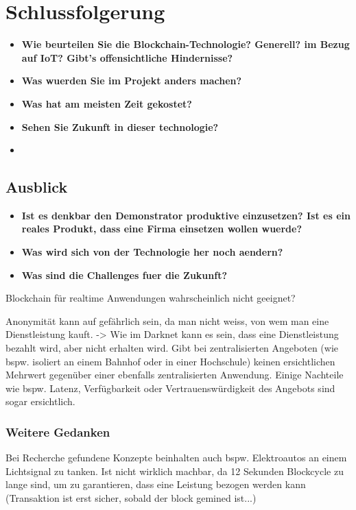 \chapter{Schlussfolgerung}
\label{cha:Schlussfolgerung}
\begin{itemize}
    \item \textbf{Wie beurteilen Sie die Blockchain-Technologie? Generell? im Bezug auf IoT? Gibt's offensichtliche Hindernisse?}
    \item \textbf{Was wuerden Sie im Projekt anders machen?}
    \item \textbf{Was hat am meisten Zeit gekostet?}
    
    \item \textbf{Sehen Sie Zukunft in dieser technologie?}
    \item \textbf{}
\end{itemize}

\section{Ausblick}
\label{sec:Ausblick}
\begin{itemize}
    \item \textbf{Ist es denkbar den Demonstrator produktive einzusetzen? Ist es ein reales Produkt, dass eine Firma einsetzen wollen wuerde?}
    \item \textbf{Was wird sich von der Technologie her noch aendern?}
    \item \textbf{Was sind die Challenges fuer die Zukunft?}
\end{itemize}
Blockchain für realtime Anwendungen wahrscheinlich nicht geeignet?
\par
Anonymität kann auf gefährlich sein, da man nicht weiss, von wem man eine Dienstleistung kauft. -> Wie im Darknet kann es sein, dass eine Dienstleistung bezahlt wird, aber nicht erhalten wird.
Gibt bei zentralisierten Angeboten (wie bspw. isoliert an einem Bahnhof oder in einer Hochschule) keinen ersichtlichen Mehrwert gegenüber einer ebenfalls zentralisierten Anwendung. Einige Nachteile wie bspw. Latenz, Verfügbarkeit oder Vertrauenswürdigkeit des Angebots sind sogar ersichtlich.

\subsection{Weitere Gedanken}
Bei Recherche gefundene Konzepte beinhalten auch bspw. Elektroautos an einem Lichtsignal zu tanken. Ist nicht wirklich machbar, da 12 Sekunden Blockcycle zu lange sind, um zu garantieren, dass eine Leistung bezogen werden kann (Transaktion ist erst sicher, sobald der block gemined ist...)



